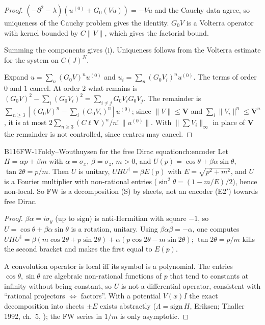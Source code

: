 \begin{proof}
$(-\partial^2-\lambda)(u^{(0)}+G_0(Vu))=-Vu$ and the Cauchy data agree, so uniqueness of the Cauchy problem gives the identity. $G_0V$ is a Volterra operator with kernel bounded by $C\|V\|$, which gives the factorial bound.

Summing the components gives (i). Uniqueness follows from the Volterra estimate for the system on $C(J)^N$.

Expand $u=\sum_n(G_0V)^nu^{(0)}$ and $u_i=\sum_n(G_0V_i)^nu^{(0)}$. The terms of order $0$ and $1$ cancel. At order $2$ what remains is $(G_0V)^2-\sum_i(G_0V_i)^2=\sum_{i\ne j}G_0V_iG_0V_j$. The remainder is $\sum_{n\ge3}[(G_0V)^n-\sum_i(G_0V_i)^n]u^{(0)}$; since $\|V\|\le\mathbf V$ and $\sum_i\|V_i\|^n\le\mathbf V^n$, it is at most $2\sum_{n\ge3}(C\ell\mathbf V)^n/n!\,\|u^{(0)}\|$. With $\|\sum V_i\|_\infty$ in place of $\mathbf V$ the remainder is not controlled, since centres may cancel.

\end{proof}

\begin{dimcard}{B116}{FW-1}{Foldy--Wouthuysen for the free Dirac equation}{\pw}{ch:encoder}
Let $H=\alpha p+\beta m$ with $\alpha=\sigma_x$, $\beta=\sigma_z$, $m>0$, and $U(p)=\cos\theta+\beta\alpha\sin\theta$, $\tan2\theta=p/m$. Then $U$ is unitary, $UHU^\dagger=\beta E(p)$ with $E=\sqrt{p^2+m^2}$, and $U$ is a Fourier multiplier with non-rational entries ($\sin^2\theta=(1-m/E)/2$), hence non-local. So FW is a decomposition (S) by sheets, not an encoder (E2$'$) towards free Dirac.
\end{dimcard}

\begin{proof}
$\beta\alpha=i\sigma_y$ (up to sign) is anti-Hermitian with square $-1$, so $U=\cos\theta+\beta\alpha\sin\theta$ is a rotation, unitary. Using $\beta\alpha\beta=-\alpha$, one computes $UHU^\dagger=\beta(m\cos2\theta+p\sin2\theta)+\alpha(p\cos2\theta-m\sin2\theta)$; $\tan2\theta=p/m$ kills the second bracket and makes the first equal to $E(p)$.

A convolution operator is local iff its symbol is a polynomial. The entries $\cos\theta,\sin\theta$ are algebraic non-rational functions of $p$ that tend to constants at infinity without being constant, so $U$ is not a differential operator, consistent with ``rational projectors $\iff$ factors''. With a potential $V(x)I$ the exact decomposition into sheets $\pm E$ exists abstractly ($\Lambda=\mathrm{sign}\,H$, Eriksen; Thaller 1992, ch.~5, \cf); the FW series in $1/m$ is only asymptotic.

\end{proof}

